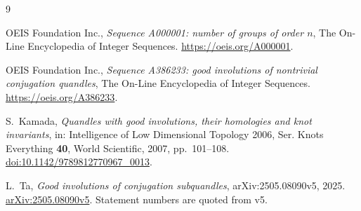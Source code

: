 \documentclass[11pt]{amsart}
\theoremstyle{definition}
\begin{document}
\begin{thebibliography}{9}

OEIS Foundation Inc.,
\emph{Sequence A000001: number of groups of order $n$},
The On-Line Encyclopedia of Integer Sequences.
\href{https://oeis.org/A000001}{https://oeis.org/A000001}.

OEIS Foundation Inc.,
\emph{Sequence A386233: good involutions of nontrivial conjugation quandles},
The On-Line Encyclopedia of Integer Sequences.
\href{https://oeis.org/A386233}{https://oeis.org/A386233}.

S.~Kamada,
\emph{Quandles with good involutions, their homologies and knot invariants},
in: Intelligence of Low Dimensional Topology 2006, Ser. Knots Everything \textbf{40},
World Scientific, 2007, pp.~101--108.
\href{https://doi.org/10.1142/9789812770967_0013}{doi:10.1142/9789812770967\_0013}.

L.~Ta,
\emph{Good involutions of conjugation subquandles},
arXiv:2505.08090v5, 2025.
\href{https://arxiv.org/abs/2505.08090v5}{arXiv:2505.08090v5}.
Statement numbers are quoted from v5.

\end{thebibliography}
\end{document}
